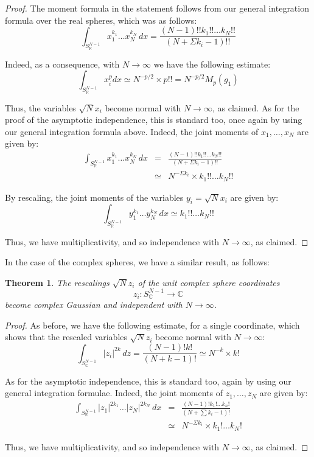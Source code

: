 \documentclass[12pt]{amsbook}
\newtheorem{theorem}{Theorem}[chapter]
\begin{document}
\begin{proof}
The moment formula in the statement follows from our general integration formula over the real spheres, which was as follows:
$$\int_{S^{N-1}_\mathbb R}x_1^{k_1}\ldots x_N^{k_N}\,dx=\frac{(N-1)!!k_1!!\ldots k_N!!}{(N+\Sigma k_i-1)!!}$$

Indeed, as a consequence, with $N\to\infty$ we have the following estimate:
$$\int_{S^{N-1}_\mathbb R}x_i^pdx
\simeq N^{-p/2}\times p!!
=N^{-p/2}M_p(g_1)$$

Thus, the variables $\sqrt{N}x_i$ become normal with $N\to\infty$, as claimed. As for the proof of the asymptotic independence, this is standard too, once again by using our general integration formula above. Indeed, the joint moments of $x_1,\ldots,x_N$ are given by:
\begin{eqnarray*}
\int_{S^{N-1}_\mathbb R}x_1^{k_1}\ldots x_N^{k_N}\,dx
&=&\frac{(N-1)!!k_1!!\ldots k_N!!}{(N+\Sigma k_i-1)!!}\\
&\simeq&N^{-\Sigma k_i}\times k_1!!\ldots k_N!!
\end{eqnarray*}

By rescaling, the joint moments of the variables $y_i=\sqrt{N}x_i$ are given by:
$$\int_{S^{N-1}_\mathbb R}y_1^{k_1}\ldots y_N^{k_N}\,dx\simeq k_1!!\ldots k_N!!$$

Thus, we have multiplicativity, and so independence with $N\to\infty$, as claimed.
\end{proof}

In the case of the complex spheres, we have a similar result, as follows:


\begin{theorem}
The rescalings $\sqrt{N}z_i$ of the unit complex sphere coordinates
$$z_i:S^{N-1}_\mathbb C\to\mathbb C$$
become complex Gaussian and independent with $N\to\infty$. 
\end{theorem}

\begin{proof}
As before, we have the following estimate, for a single coordinate, which shows that  the rescaled variables $\sqrt{N}z_i$ become normal with $N\to\infty$:
$$\int_{S^{N-1}_\mathbb C}|z_i|^{2k}\,dz=\frac{(N-1)!k!}{(N+k-1)!}\simeq N^{-k}\times k!$$

As for the asymptotic independence, this is standard too, again by using our general integration formulae. Indeed, the joint moments of $z_1,\ldots,z_N$ are given by:
\begin{eqnarray*}
\int_{S^{N-1}_\mathbb R}|z_1|^{2k_1}\ldots|z_N|^{2k_N}\,dx
&=&\frac{(N-1)!k_1!\ldots k_n!}{(N+\sum k_i-1)!}\\
&\simeq&N^{-\Sigma k_i}\times k_1!\ldots k_N!
\end{eqnarray*}

Thus, we have multiplicativity, and so independence with $N\to\infty$, as claimed.
\end{proof}
\end{document}
